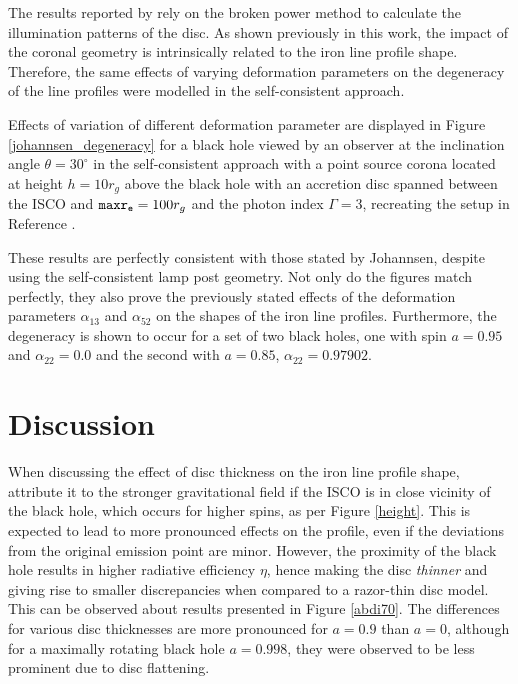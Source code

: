 \documentclass[fleqn,usenatbib,useAMS]{mnras}
\begin{document}
The results reported by \cite{johannsen2014x} rely on the broken power method to calculate the illumination patterns of the disc. As shown previously in this work, the impact of the coronal geometry is intrinsically related to the iron line profile shape. Therefore, the same effects of varying deformation parameters on the degeneracy of the line profiles were modelled in the self-consistent approach.

Effects of variation of different deformation parameter are displayed in Figure \ref{johannsen_degeneracy} for a black hole viewed by an observer at the inclination angle $\theta = 30^{\circ}$ in the self-consistent approach with a point source corona located at height $h = 10 r_{g}$ above the black hole with an accretion disc spanned between the ISCO and ${\tt maxr_{e}} = 100 r_{g}$ and the photon index $\Gamma = 3$, recreating the setup in Reference \cite{johannsen2014x}.


These results are perfectly consistent with those stated by Johannsen, despite using the self-consistent lamp post geometry. Not only do the figures match perfectly, they also prove the previously stated effects of the deformation parameters $\alpha_{13}$ and $\alpha_{52}$ on the shapes of the iron line profiles. Furthermore, the degeneracy is shown to occur for a set of two black holes, one with spin $a = 0.95$ and $\alpha_{22} = 0.0$ and the second with $a = 0.85$, $\alpha_{22} = 0.97902$.


\section{Discussion} 
When discussing the effect of disc thickness on the iron line profile shape, \cite{abdikamalov2020testing} attribute it to the stronger gravitational field if the ISCO is in close vicinity of the black hole, which occurs for higher spins, as per Figure \ref{height}. This is expected to lead to more pronounced effects on the profile, even if the deviations from the original emission point are minor. However, the proximity of the black hole results in higher radiative efficiency $\eta$, hence making the disc \textit{thinner} and giving rise to smaller discrepancies when compared to a razor-thin disc model. This can be observed about results presented in Figure \ref{abdi70}. The differences for various disc thicknesses are more pronounced for $a = 0.9$ than $a = 0$, although for a maximally rotating black hole $a = 0.998$, they were observed to be less prominent due to disc flattening.
\end{document}
